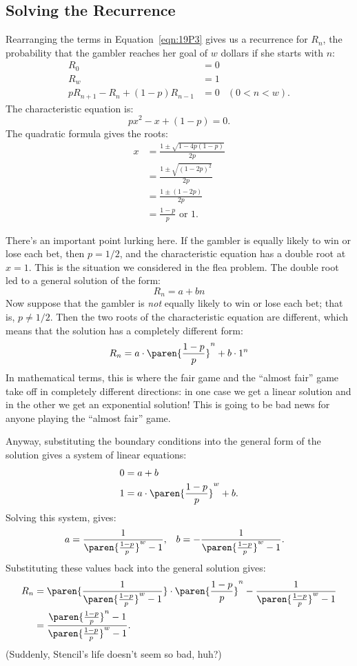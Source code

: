 \subsection{Solving the Recurrence}

Rearranging the terms in Equation~\ref{eqn:19P3} gives us a recurrence
for $R_n$, the probability that the gambler reaches her goal of $w$
dollars if she starts with $n$:
%
\begin{align*}
R_0 & = 0 \\
R_w & = 1 \\
p R_{n + 1} - R_n + (1 - p) R_{n - 1} &= 0
& (0 < n < w).
\end{align*}
%
The characteristic equation is:
%
\[
    p x^2 - x + (1-p) = 0.
\]
%
The quadratic formula gives the roots:
%
\begin{align*}
x & = \frac{1 \pm \sqrt{1 - 4 p (1-p)}}{2p} \\
  & = \frac{1 \pm \sqrt{(1-2p)^2}}{2p} \\
  & = \frac{1 \pm (1-2p)}{2p} \\
  & = \frac{1-p}{p} \text{ or } 1.
\end{align*}

There's an important point lurking here.  If the gambler is equally
likely to win or lose each bet, then $p = 1/2$, and the characteristic
equation has a double root at $x = 1$.  This is the situation we
considered in the flea problem.  The double root led to a general
solution of the form:
%
\[
R_n = a + b n
\]
%
Now suppose that the gambler is \emph{not} equally likely to win or
lose each bet; that is, $p \neq 1/2$.  Then the two roots of the
characteristic equation are different, which means that the solution
has a completely different form:
%
\[
R_n = a \cdot \paren{\frac{1-p}{p}}^n + b \cdot 1^n
\]
%
In mathematical terms, this is where the fair game and the ``almost
fair'' game take off in completely different directions: in one case
we get a linear solution and in the other we get an exponential
solution!  This is going to be bad news for anyone playing the
``almost fair'' game.

Anyway, substituting the boundary conditions into the general form of
the solution gives a system of linear equations:
%
\begin{align*}
0 & = a + b \\
1 & = a \cdot \paren{\frac{1-p}{p}}^w + b.
\end{align*}
%
Solving this system, gives:
%
\begin{align*}
a & = \frac{1}{\paren{\frac{1-p}{p}}^w-1}, &
b & = - \frac{1}{\paren{\frac{1-p}{p}}^w-1}. &
\end{align*}
%
Substituting these values back into the general solution gives:
%
\begin{align*}
R_n
    & = \paren{\frac{1}{\paren{\frac{1-p}{p}}^w-1}} \cdot
        \paren{\frac{1-p}{p}}^n - \frac{1}{\paren{\frac{1-p}{p}}^w-1} \\
    & = \frac{\paren{\frac{1-p}{p}}^n-1}{\paren{\frac{1-p}{p}}^w-1}.
\end{align*}
%
(Suddenly, Stencil's life doesn't seem so bad, huh?)

